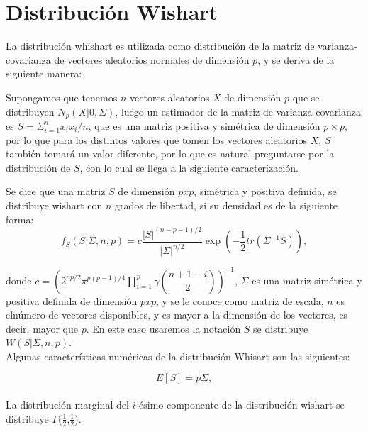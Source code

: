 \pagebreak
\section{Distribución Wishart}

La distribución whishart es utilizada como distribución de la matriz de varianza-covarianza de
vectores aleatorios normales de dimensión $p$, y se deriva de la siguiente manera:

Supongamos que tenemos $n$ vectores aleatorios $X$  de dimensión $p$ que se distribuyen $N_{p}(X|0,\Sigma)$, luego un estimador de la matriz de varianza-covarianza es $S=\Sigma_{i=1}^{n}x_{i}x_{i}/n$, que es una matriz positiva y simétrica de dimensión $p\times p$, por lo que para los distintos valores que tomen los vectores aleatorios $X$, $S$ también tomará un valor diferente, por lo que es natural preguntarse por la distribución de $S$, con lo cual se llega a la siguiente caracterización. 

Se dice que una matriz $S$ de dimensión $pxp$, simétrica y positiva definida, se distribuye wishart con $n$ grados de libertad, si su densidad es de la siguiente forma:
\begin{equation*}
	f_{S}(S|\Sigma,n,p)= c\frac{|S|^{(n-p-1)/2}}{|\Sigma|^{n/2}}\exp(-\frac{1}{2}tr(\Sigma^{-1}S)),
\end{equation*}

donde $c=\left(2^{np/2}\pi ^{p(p-1)/4}\prod_{i=1}^{p}\gamma(\dfrac{n+1-i}{2})\right)^{-1}$, $\Sigma$ es una matriz simétrica y positiva definida de dimensión $pxp$, y se le conoce como matriz de escala, $n$ es elnúmero de vectores disponibles, y es mayor a la dimensión de los vectores, es decir, mayor que $p$. En este caso usaremos la notación $S$ se distribuye $W(S|\Sigma,n,p)$.\\

Algunas características numéricas de la distribución Whisart son las siguientes:

\begin{equation*}
	E[S]=p\Sigma,
\end{equation*} \nonumber\\
La distribución marginal del $i$-ésimo componente de la distribución wishart se distribuye $\Gamma$($\frac{1}{2}$,$\frac{1}{2}$).\nonumber





